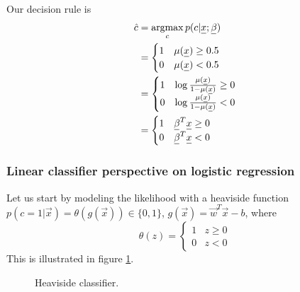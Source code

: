 Our decision rule is
\begin{equation}
    \begin{aligned}
        \hat{c} &= \argmax_c p(c | \vec{x}; \vec{\beta}) \\
        &= \begin{cases}
            1 & \mu(\vec{x}) \geq 0.5 \\
            0 & \mu(\vec{x}) < 0.5
        \end{cases} \\
        &= \begin{cases}
            1 & \log \frac{\mu(\vec{x})}{1-\mu(\vec{x})} \geq 0 \\
            0 & \log \frac{\mu(\vec{x})}{1-\mu(\vec{x})} < 0
        \end{cases} \\
        &= \begin{cases}
            1 & \vec{\beta}^T \vec{x} \geq 0 \\
            0 & \vec{\beta}^T \vec{x} < 0
        \end{cases}
    \end{aligned}
\end{equation}

\subsubsection{Linear classifier perspective on logistic regression}
Let us start by modeling the likelihood with a heaviside function
$p(c = 1|\vec{x}) = \theta(g(\vec{x})) \in \{0,1\}$, $g(\vec{x}) = \vec{w}^T \vec{x} - b$, where
\begin{equation}
    \theta(z) = \begin{cases}
        1 & z \geq 0 \\
        0 & z < 0
    \end{cases}
\end{equation}
This is illustrated in figure \ref{fig:heaviside_classifier}.
\begin{figure}[!htb]
    \centering
    
    \caption{Heaviside classifier.}
    \label{fig:heaviside_classifier}
\end{figure}


